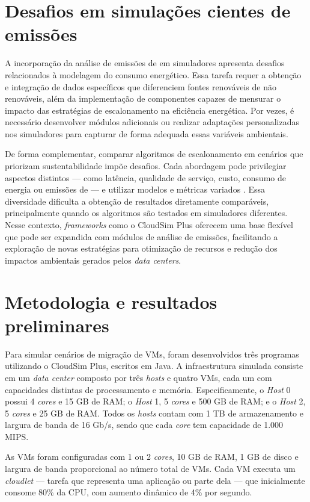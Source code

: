 \documentclass[12pt]{article}
\begin{document}
\section{Desafios em simulações cientes de emissões}

A incorporação da análise de emissões de  em simuladores apresenta desafios relacionados à modelagem do consumo energético. Essa tarefa requer a obtenção e integração de dados específicos que diferenciem fontes renováveis de não renováveis, além da implementação de componentes capazes de mensurar o impacto das estratégias de escalonamento na eficiência energética. Por vezes, é necessário desenvolver módulos adicionais ou realizar adaptações personalizadas nos simuladores para capturar de forma adequada essas variáveis ambientais.

De forma complementar, comparar algoritmos de escalonamento em cenários que priorizam sustentabilidade impõe desafios. Cada abordagem pode privilegiar aspectos distintos --- como latência, qualidade de serviço, custo, consumo de energia ou emissões de  --- e utilizar modelos e métricas variados \cite{kumar:19}. Essa diversidade dificulta a obtenção de resultados diretamente comparáveis, principalmente quando os algoritmos são testados em simuladores diferentes. Nesse contexto, \textit{frameworks} como o CloudSim Plus \cite{silva:17} oferecem uma base flexível que pode ser expandida com módulos de análise de emissões, facilitando a exploração de novas estratégias para otimização de recursos e redução dos impactos ambientais gerados pelos \textit{data centers}.

\section{Metodologia e resultados preliminares}

Para simular cenários de migração de VMs, foram desenvolvidos três programas utilizando o CloudSim Plus, escritos em Java. A infraestrutura simulada consiste em um \textit{data center} composto por três \textit{hosts} e quatro VMs, cada um com capacidades distintas de processamento e memória. Especificamente, o \textit{Host} 0 possui 4 \textit{cores} e 15 GB de RAM; o \textit{Host} 1, 5 \textit{cores} e 500 GB de RAM; e o \textit{Host} 2, 5 \textit{cores} e 25 GB de RAM. Todos os \textit{hosts} contam com 1 TB de armazenamento e largura de banda de 16 Gb/s, sendo que cada \textit{core} tem capacidade de 1.000 MIPS.

As VMs foram configuradas com 1 ou 2 \textit{cores}, 10 GB de RAM, 1 GB de disco e largura de banda proporcional ao número total de VMs. Cada VM executa um \textit{cloudlet} --- tarefa que representa uma aplicação ou parte dela --- que inicialmente consome 80\% da CPU, com aumento dinâmico de 4\% por segundo.
\end{document}
